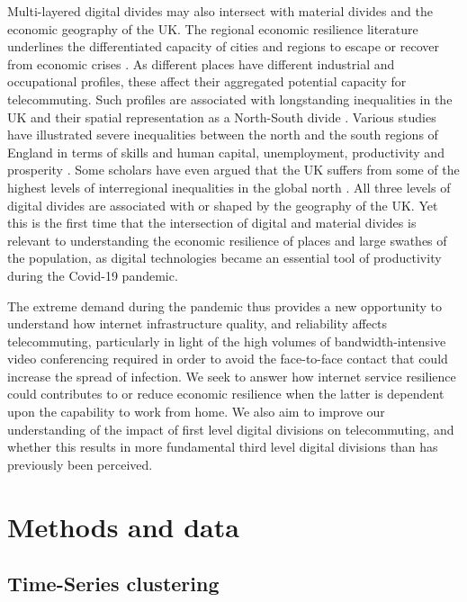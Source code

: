 \documentclass[Royal,times,sageh]{sagej}
\begin{document}
Multi-layered digital divides may also intersect with material divides
and the economic geography of the UK. The regional economic resilience
literature underlines the differentiated capacity of cities and regions
to escape or recover from economic crises
\citep{martin2012regional, kitsos2018economic}. As different places have
different industrial and occupational profiles, these affect their
aggregated potential capacity for telecommuting. Such profiles are
associated with longstanding inequalities in the UK and their spatial
representation as a North-South divide \citep{martin_north_south}.
Various studies have illustrated severe inequalities between the north
and the south regions of England in terms of skills and human capital,
unemployment, productivity and prosperity
\citep{lee2014grim, mccann2020perceptions, dorling2018peak}. Some
scholars have even argued that the UK suffers from some of the highest
levels of interregional inequalities in the global north
\citep{gal2018reducing, mccann2016uk}. All three levels of digital
divides are associated with or shaped by the geography of the UK. Yet
this is the first time that the intersection of digital and material
divides is relevant to understanding the economic resilience of places
and large swathes of the population, as digital technologies became an
essential tool of productivity during the Covid-19 pandemic.

The extreme demand during the pandemic thus provides a new opportunity
to understand how internet infrastructure quality, and reliability
affects telecommuting, particularly in light of the high volumes of
bandwidth-intensive video conferencing required in order to avoid the
face-to-face contact that could increase the spread of infection. We
seek to answer how internet service resilience could contributes to or
reduce economic resilience when the latter is dependent upon the
capability to work from home. We also aim to improve our understanding
of the impact of first level digital divisions on telecommuting, and
whether this results in more fundamental third level digital divisions
than has previously been perceived.

\hypertarget{sec:3}{%
\section{Methods and data}\label{sec:3}}

\hypertarget{sec:3.1}{%
\subsection{Time-Series clustering}\label{sec:3.1}}
\end{document}
